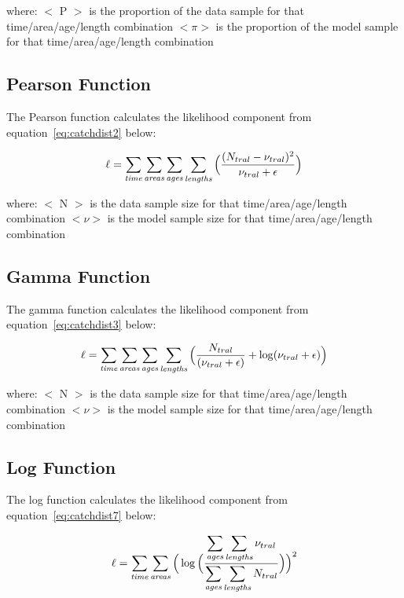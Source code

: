 \documentclass [a4paper, 10pt]{book}
\begin{document}
where:\newline
$<$ P $>$ is the proportion of the data sample for that time/area/age/length combination\newline
$<\pi>$ is the proportion of the model sample for that time/area/age/length combination

\subsection{Pearson Function}
The Pearson function calculates the likelihood component from equation~\ref{eq:catchdist2} below:

\begin{equation}\label{eq:catchdist2}
\ell = \sum_{\it time}\sum_{\it areas}\sum_{\it ages}\sum_{\it lengths} \Big( {\frac{ ( N_{tral} - \nu_{tral} ) ^2} {\nu_{tral} + \epsilon}} \Big)
\end{equation}

where:\newline
$<$ N $>$ is the data sample size for that time/area/age/length combination\newline
$<\nu>$ is the model sample size for that time/area/age/length combination

\subsection{Gamma Function}
The gamma function calculates the likelihood component from equation~\ref{eq:catchdist3} below:

\begin{equation}\label{eq:catchdist3}
\ell = \sum_{\it time}\sum_{\it areas}\sum_{\it ages}\sum_{\it lengths} \Big( {\frac{ N_{tral}} { (\nu_{tral} + \epsilon )} + \log ({\nu_{tral} + \epsilon}}) \Big)
\end{equation}

where:\newline
$<$ N $>$ is the data sample size for that time/area/age/length combination\newline
$<\nu>$ is the model sample size for that time/area/age/length combination

\subsection{Log Function}
The log function calculates the likelihood component from equation~\ref{eq:catchdist7} below:

\begin{equation}\label{eq:catchdist7}
\ell = \sum_{\it time}\sum_{\it areas} \Big(  \log \Big( {\frac{ \displaystyle \sum_{\it ages}\sum_{\it lengths}  \nu_{tral}} { \displaystyle \sum_{\it ages}\sum_{\it lengths} N_{tral}}} \Big) \Big) ^2
\end{equation}
\end{document}
